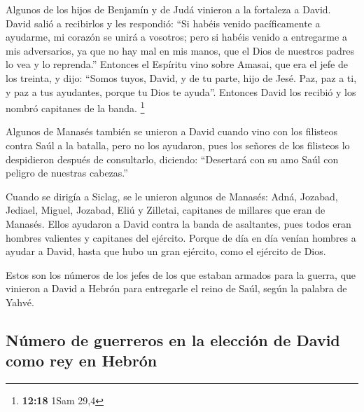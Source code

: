 \begin{paracol}{2}
 Algunos de los hijos de Benjamín y de Judá vinieron a la
fortaleza a David.  David salió a recibirlos y les
respondió: ``Si habéis venido pacíficamente a ayudarme, mi corazón se
unirá a vosotros; pero si habéis venido a entregarme a mis adversarios,
ya que no hay mal en mis manos, que el Dios de nuestros padres lo vea y
lo reprenda.''  Entonces el Espíritu vino sobre Amasai,
que era el jefe de los treinta, y dijo: ``Somos tuyos, David, y de tu
parte, hijo de Jesé. Paz, paz a ti, y paz a tus ayudantes, porque tu
Dios te ayuda''. Entonces David los recibió y los nombró capitanes de la
banda. \footnote{\textbf{12:18} 1Sam 29,4}

 Algunos de Manasés también se unieron a David cuando
vino con los filisteos contra Saúl a la batalla, pero no los ayudaron,
pues los señores de los filisteos lo despidieron después de consultarlo,
diciendo: ``Desertará con su amo Saúl con peligro de nuestras cabezas.''

 Cuando se dirigía a Siclag, se le unieron algunos de
Manasés: Adná, Jozabad, Jediael, Miguel, Jozabad, Eliú y Zilletai,
capitanes de millares que eran de Manasés.  Ellos
ayudaron a David contra la banda de asaltantes, pues todos eran hombres
valientes y capitanes del ejército.  Porque de día en día
venían hombres a ayudar a David, hasta que hubo un gran ejército, como
el ejército de Dios.

 Estos son los números de los jefes de los que estaban
armados para la guerra, que vinieron a David a Hebrón para entregarle el
reino de Saúl, según la palabra de Yahvé.

\hypertarget{nuxfamero-de-guerreros-en-la-elecciuxf3n-de-david-como-rey-en-hebruxf3n}{%
\subsection{Número de guerreros en la elección de David como rey en
Hebrón}\label{nuxfamero-de-guerreros-en-la-elecciuxf3n-de-david-como-rey-en-hebruxf3n}}


\end{paracol}
